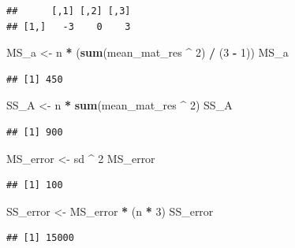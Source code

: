 \documentclass[]{book}
\newenvironment{Shaded}{\begin{snugshade}}{\end{snugshade}}
\newcommand{\DecValTok}[1]{\textcolor[rgb]{0.00,0.00,0.81}{#1}}
\newcommand{\KeywordTok}[1]{\textcolor[rgb]{0.13,0.29,0.53}{\textbf{#1}}}
\newcommand{\NormalTok}[1]{#1}
\newcommand{\OperatorTok}[1]{\textcolor[rgb]{0.81,0.36,0.00}{\textbf{#1}}}
\newcommand{\StringTok}[1]{\textcolor[rgb]{0.31,0.60,0.02}{#1}}
\begin{document}
\begin{verbatim}
##      [,1] [,2] [,3]
## [1,]   -3    0    3
\end{verbatim}

\begin{Shaded}
\begin{Highlighting}[]
\NormalTok{MS_a <-}\StringTok{ }\NormalTok{n }\OperatorTok{*}\StringTok{ }\NormalTok{(}\KeywordTok{sum}\NormalTok{(mean_mat_res }\OperatorTok{^}\StringTok{ }\DecValTok{2}\NormalTok{) }\OperatorTok{/}\StringTok{ }\NormalTok{(}\DecValTok{3} \OperatorTok{-}\StringTok{ }\DecValTok{1}\NormalTok{))}
\NormalTok{MS_a}
\end{Highlighting}
\end{Shaded}

\begin{verbatim}
## [1] 450
\end{verbatim}

\begin{Shaded}
\begin{Highlighting}[]
\NormalTok{SS_A <-}\StringTok{ }\NormalTok{n }\OperatorTok{*}\StringTok{ }\KeywordTok{sum}\NormalTok{(mean_mat_res }\OperatorTok{^}\StringTok{ }\DecValTok{2}\NormalTok{)}
\NormalTok{SS_A}
\end{Highlighting}
\end{Shaded}

\begin{verbatim}
## [1] 900
\end{verbatim}

\begin{Shaded}
\begin{Highlighting}[]
\NormalTok{MS_error <-}\StringTok{ }\NormalTok{sd }\OperatorTok{^}\StringTok{ }\DecValTok{2}
\NormalTok{MS_error}
\end{Highlighting}
\end{Shaded}

\begin{verbatim}
## [1] 100
\end{verbatim}

\begin{Shaded}
\begin{Highlighting}[]
\NormalTok{SS_error <-}\StringTok{ }\NormalTok{MS_error }\OperatorTok{*}\StringTok{ }\NormalTok{(n }\OperatorTok{*}\StringTok{ }\DecValTok{3}\NormalTok{)}
\NormalTok{SS_error}
\end{Highlighting}
\end{Shaded}

\begin{verbatim}
## [1] 15000
\end{verbatim}
\end{document}
